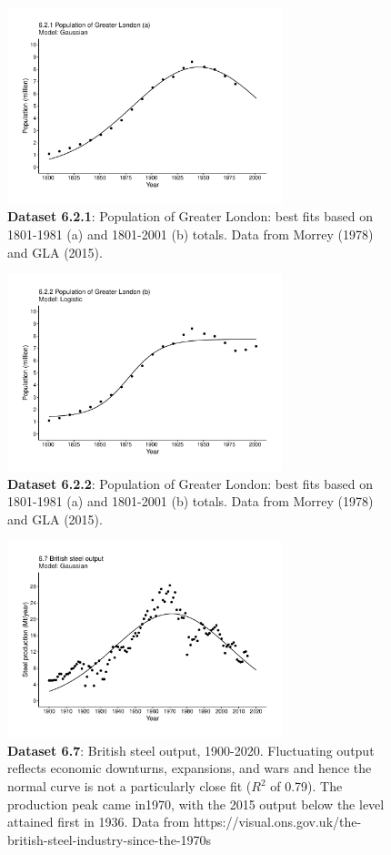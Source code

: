 \documentclass[aps,rmp,preprint,superscriptaddress,10pt,onecolumn]{article}
\begin{document}
\begin{figure}[h]
\includegraphics[width=8cm]{output/figs-ggplot/6.2.1.pdf}
\caption{\textbf{Dataset 6.2.1}: Population of Greater London: best fits based on 1801-1981 (a) and 1801-2001 (b) totals. Data from Morrey (1978) and GLA (2015). }
\end{figure}
	
\begin{figure}[h]
\includegraphics[width=8cm]{output/figs-ggplot/6.2.2.pdf}
\caption{\textbf{Dataset 6.2.2}: Population of Greater London: best fits based on 1801-1981 (a) and 1801-2001 (b) totals. Data from Morrey (1978) and GLA (2015). }
\end{figure}
	
\begin{figure}[h]
\includegraphics[width=8cm]{output/figs-ggplot/6.7.pdf}
\caption{\textbf{Dataset 6.7}: British steel output, 1900-2020. Fluctuating output reflects economic downturns, expansions, and wars and hence the normal curve is not a particularly close fit ($R^2$ of 0.79). The production peak came in1970, with the 2015 output below the level attained first in 1936. Data from https://visual.ons.gov.uk/the-british-steel-industry-since-the-1970s}
\end{figure}
	
\end{document}

